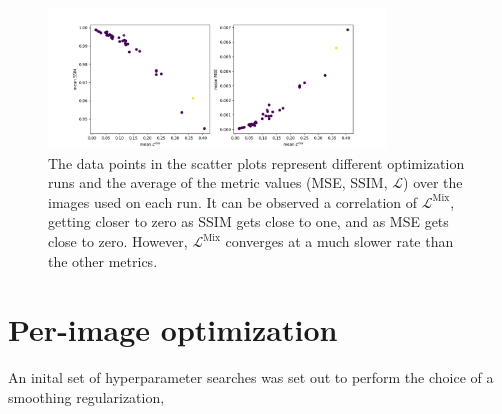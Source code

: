 \documentclass[nomenclature, english, bibtex]{kththesis}
\numberwithin{listing}{chapter}
\begin{document}
\begin{figure}
    \centering
    \includegraphics[width=0.8\textwidth]{figures/L_mix.png}
    \caption{The data points in the scatter plots represent different optimization runs and the average of the metric values
    (MSE, SSIM, $\mathcal{L}$) over the images used on each run. It can be observed a correlation of $\mathcal{L}^{\text{Mix}}$,
    getting closer to zero as SSIM gets close to one, and as MSE gets close to zero. However, $\mathcal{L}^{\text{Mix}}$
    converges at a much slower rate than the other metrics.}
    \label{fig:transmission_maps}
\end{figure}

\section{Per-image optimization}

An inital set of hyperparameter searches was set out to perform the choice of a smoothing regularization,
\end{document}

